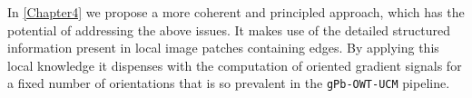 In \cref{Chapter4} we propose a more coherent %
and principled approach, which has the potential of addressing the above issues. It makes use of the detailed structured information present in local image patches containing edges. By applying this local knowledge it dispenses with the computation of oriented gradient signals for a fixed number of orientations that is so prevalent in the {\tt gPb-OWT-UCM} pipeline.
